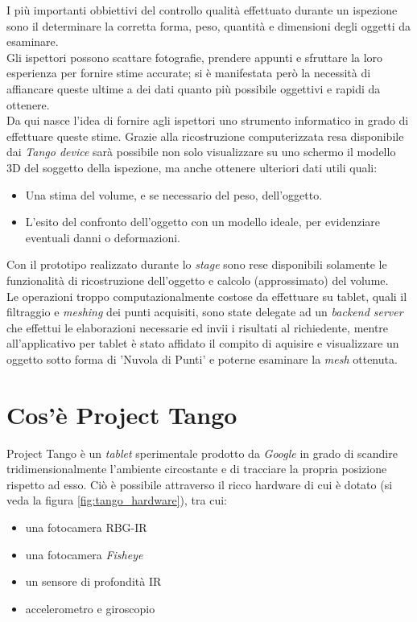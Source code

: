 I più importanti obbiettivi del controllo qualità effettuato durante un ispezione sono il determinare la corretta forma, peso, quantità e dimensioni degli oggetti da esaminare.\\
Gli ispettori possono scattare fotografie, prendere appunti e sfruttare la loro esperienza per fornire stime accurate; si è manifestata però la necessità di affiancare queste ultime a dei dati quanto più possibile oggettivi e rapidi da ottenere.\\
Da qui nasce l'idea di fornire agli ispettori uno strumento informatico in grado di effettuare queste stime. Grazie alla ricostruzione computerizzata resa disponibile dai \emph{Tango device} sarà possibile non solo visualizzare su uno schermo il modello 3D del soggetto della ispezione, ma anche ottenere ulteriori dati utili quali:
\begin{itemize}
	\item Una stima del volume, e se necessario del peso, dell'oggetto.
	\item L'esito del confronto dell'oggetto con un modello ideale, per evidenziare eventuali danni o deformazioni.
\end{itemize}
Con il prototipo realizzato durante lo \emph{stage} sono rese disponibili solamente le funzionalità di ricostruzione dell'oggetto e calcolo (approssimato) del volume.\\
Le operazioni troppo computazionalmente costose da effettuare su tablet, quali il filtraggio e \emph{meshing} dei punti acquisiti, sono state delegate ad un \emph{backend server} che effettui le elaborazioni necessarie ed invii i risultati al richiedente, mentre all'applicativo per tablet è stato affidato il compito di aquisire e visualizzare un oggetto sotto forma di 'Nuvola di Punti' e poterne esaminare la \emph{mesh} ottenuta.

\section{Cos'è Project Tango}

Project Tango è un \emph{tablet} sperimentale prodotto da \emph{Google} in grado di scandire tridimensionalmente l'ambiente circostante e di tracciare la propria posizione rispetto ad esso. Ciò è possibile attraverso il ricco hardware di cui è dotato (si veda la figura \ref{fig:tango_hardware}), tra cui:
\begin{itemize}
\item una fotocamera RBG-IR\\
\item una fotocamera \emph{Fisheye}\\
\item un sensore di profondità IR\\
\item accelerometro e giroscopio\\
\end{itemize}


